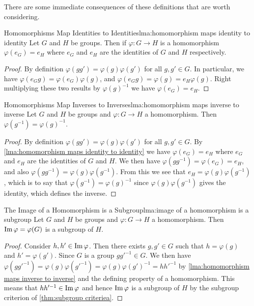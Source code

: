 There are some immediate consequences of these definitions that are worth considering.
\begin{lma}{Homomorphisms Map Identities to Identities}{lma:homomorphism maps identity to identity}
    Let \(G\) and \(H\) be groups.
    Then if \(\varphi\colon G \to H\) is a homomorphism \(\varphi(e_{G}) = e_{H}\) where \(e_G\) and \(e_H\) are the identities of \(G\) and \(H\) respectively.
    
    \begin{proof}
        By definition \(\varphi(gg') = \varphi(g)\varphi(g')\) for all \(g, g' \in G\).
        In particular, we have \(\varphi(e_Gg) = \varphi(e_G)\varphi(g)\), and \(\varphi(e_Gg) = \varphi(g) = e_H\varphi(g)\).
        Right multiplying these two results by \(\varphi(g)^{-1}\) we have \(\varphi(e_G) = e_H\).
    \end{proof}
\end{lma}

\begin{lma}{Homomorphisms Map Inverses to Inverses}{lma:homomorphism maps inverse to inverse}
    Let \(G\) and \(H\) be groups and \(\varphi \colon G \to H\) a homomorphism.
    Then \(\varphi(g^{-1}) = \varphi(g)^{-1}\).
    
    \begin{proof}
        By definition \(\varphi(gg') = \varphi(g)\varphi(g')\) for all \(g, g' \in G\).
        By \cref{lma:homomorphism maps identity to identity} we have \(\varphi(e_G) = e_H\) where \(e_G\) and \(e_H\) are the identities of \(G\) and \(H\).
        We then have \(\varphi(gg^{-1}) = \varphi(e_G) = e_H\), and also \(\varphi(gg^{-1}) = \varphi(g)\varphi(g^{-1})\).
        From this we see that \(e_H = \varphi(g)\varphi(g^{-1})\), which is to say that \(\varphi(g^{-1}) = \varphi(g)^{-1}\) since \(\varphi(g)\varphi(g^{-1})\) gives the identity, which defines the inverse.
    \end{proof}
\end{lma}

\begin{lma}{The Image of a Homomorphism is a Subgroup}{lma:image of a homomorphism is a subgroup}
    Let \(G\) and \(H\) be groups and \(\varphi\colon G \to H\) a homomorphism.
    Then \(\operatorname{Im}\varphi = \varphi(G)\) is a subgroup of \(H\).
    
    \begin{proof}
        Consider \(h, h' \in \operatorname{Im} \varphi\).
        Then there exists \(g, g' \in G\) such that \(h = \varphi(g)\) and \(h' = \varphi(g')\).
        Since \(G\) is a group \(gg'^{-1} \in G\).
        We then have \(\varphi(gg'^{-1}) = \varphi(g)\varphi(g'^{-1}) = \varphi(g)\varphi(g')^{-1} = hh'^{-1}\) by \cref{lma:homomorphism maps inverse to inverse} and the defining property of a homomorphism.
        This means that \(hh'^{-1} \in \operatorname{Im} \varphi\) and hence \(\operatorname{Im}\varphi\) is a subgroup of \(H\) by the subgroup criterion of \cref{thm:subgroup criteriea}.
    \end{proof}
\end{lma}

